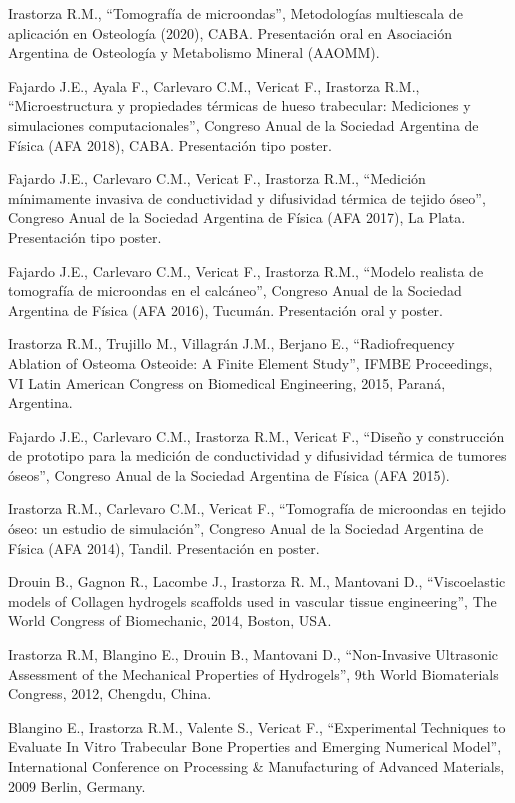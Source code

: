 \documentclass[margin,line]{res}
\begin{document}
\begin{resume}
Irastorza R.M., ``Tomografía de microondas'', Metodologías multiescala de aplicación en Osteología (2020), CABA. Presentación oral en Asociación Argentina de Osteología y Metabolismo Mineral (AAOMM).

Fajardo J.E., Ayala F., Carlevaro C.M., Vericat F., Irastorza R.M., ``Microestructura y propiedades térmicas de hueso trabecular: Mediciones y simulaciones computacionales'', Congreso Anual de la Sociedad Argentina de Física (AFA 2018), CABA. Presentación tipo poster.

Fajardo J.E., Carlevaro C.M., Vericat F., Irastorza R.M., ``Medición mínimamente invasiva de conductividad y difusividad térmica de tejido óseo'', Congreso Anual de la Sociedad Argentina de Física (AFA 2017), La Plata. Presentación tipo poster.

Fajardo J.E., Carlevaro C.M., Vericat F., Irastorza R.M., ``Modelo realista de tomografía de microondas en el calcáneo'', Congreso Anual de la Sociedad Argentina de Física (AFA 2016), Tucumán. Presentación oral y poster.

Irastorza R.M., Trujillo M., Villagrán J.M., Berjano E., ``Radiofrequency Ablation of Osteoma Osteoide: A Finite Element Study'', IFMBE Proceedings, VI Latin American Congress on Biomedical Engineering, 2015, Paraná, Argentina. 

Fajardo J.E., Carlevaro C.M., Irastorza R.M., Vericat F., ``Diseño y construcción de prototipo para la medición de conductividad y difusividad térmica de tumores óseos'', Congreso Anual de la Sociedad Argentina de Física (AFA 2015).

Irastorza R.M., Carlevaro C.M., Vericat F., ``Tomografía de microondas en tejido óseo: un estudio de simulación'', Congreso Anual de la Sociedad Argentina de Física (AFA 2014), Tandil. Presentación en poster.

Drouin B., Gagnon R., Lacombe J., Irastorza R. M., Mantovani D., ``Viscoelastic models of Collagen hydrogels scaffolds used in vascular tissue engineering'', The World Congress of Biomechanic, 2014, Boston, USA.

Irastorza R.M, Blangino E., Drouin B., Mantovani D., ``Non-Invasive Ultrasonic Assessment of the Mechanical Properties of Hydrogels'', 9th World Biomaterials Congress, 2012, Chengdu, China.

Blangino E., Irastorza R.M., Valente S., Vericat F., ``Experimental Techniques to Evaluate In Vitro Trabecular Bone Properties and Emerging Numerical Model'', International Conference on Processing \& Manufacturing of Advanced Materials, 2009 Berlin, Germany.


\end{resume}
\end{document}
